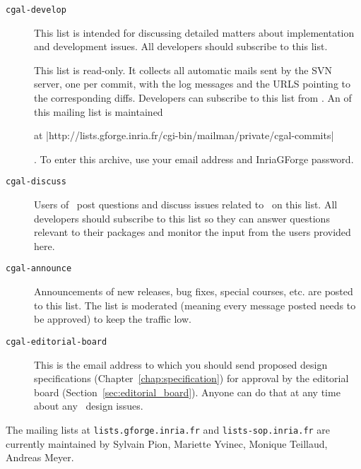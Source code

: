 \begin{description}
\item[{\tt cgal-develop}]
     This list is intended for discussing detailed matters
     about implementation and development issues.  All developers should
     subscribe to this list.

\item[]
     This list is read-only.  It collects all automatic mails sent by
     the SVN server, one per commit, with the log messages and the URLS
     pointing to the corresponding diffs.
     Developers can subscribe to this list from
     .
     An 
     of this mailing list is maintained%
     \begin{ccTexOnly}
     at \nonlinkedpath|http://lists.gforge.inria.fr/cgi-bin/mailman/private/cgal-commits|
     \end{ccTexOnly}.  To enter this archive, use your email address and InriaGForge
     password.

\item[{\tt cgal-discuss}]
     Users of \cgal\ post questions and discuss issues
     related to \cgal\ on this list.  All developers should subscribe to this
     list so they can answer questions relevant to their packages and monitor
     the input from the users provided here.

\item[{\tt cgal-announce}]
     Announcements of new releases, bug fixes, special courses, etc. are posted
     to this list.  The list is moderated (meaning every message posted needs
     to be approved) to keep the traffic low.

\item[{\tt cgal-editorial-board}]
     This is the email address to which you should
     send proposed design specifications (Chapter~\ref{chap:specification})
     for approval by the editorial
     board (Section~\ref{sec:editorial_board}). Anyone can do that
     at any time about any \cgal\ design issues.
\end{description}

The mailing lists at \texttt{lists.gforge.inria.fr} and
\texttt{lists-sop.inria.fr} are currently maintained by
Sylvain Pion, Mariette Yvinec, Monique Teillaud, Andreas Meyer.

